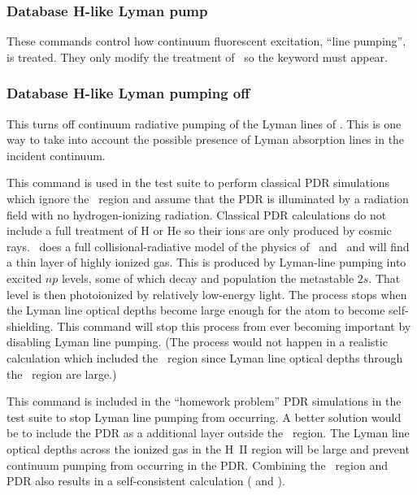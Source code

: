 \subsubsection{Database H-like Lyman pump}  

These commands control how continuum fluorescent excitation, ``line pumping'', is treated.
They only modify the treatment of \hi\ so the  keyword must appear.

\subsubsection{Database H-like Lyman pumping off}  
This turns off continuum radiative pumping of the Lyman lines of \hi.
This is one way to take into account the possible
presence of Lyman absorption lines in the incident continuum.

This command is used in the test suite to perform classical PDR
simulations which ignore the \hplus\ region and assume that the PDR is
illuminated by a radiation field with no hydrogen-ionizing radiation.
Classical PDR calculations do not include a full treatment of H or He so
their ions are only produced by cosmic rays.
\Cloudy\ does a full collisional-radiative model
of the physics of \hO\ and \heO\
and will find a thin layer of highly ionized
gas.
This is produced by Lyman-line pumping into excited $np$ levels, some of which decay and
population the metastable $2s$.
That level is then photoionized by relatively low-energy light.
The process stops when the Lyman line optical depths become large enough
for the atom to become self-shielding.
This command will stop this
process from ever becoming important by disabling Lyman line pumping.
(The process would not happen in a realistic calculation
which included the \hplus\ region since Lyman line optical depths
through the \hplus\ region are large.)

This command is included in the ``homework problem'' PDR simulations
in the test suite to
stop Lyman line pumping from occurring.
A better solution would be to include
the PDR as a additional layer outside the \hplus\ region.
The Lyman line
optical depths across the ionized gas in the H~II region will be large and prevent continuum
pumping from occurring in the PDR.
Combining the \hii\ region and PDR also
results in a self-consistent calculation
(\citealp{Abel2005} and \citealp{Abel2008} ).

